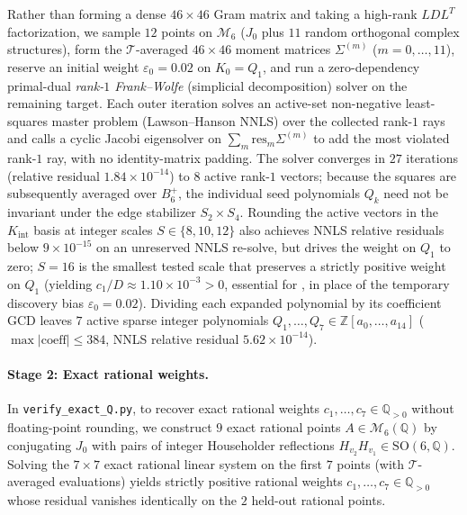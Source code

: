 \documentclass[11pt,a4paper]{article}
\theoremstyle{plain}
\theoremstyle{definition}
\theoremstyle{remark}
\newcommand{\Z}{\mathbb{Z}}
\newcommand{\Q}{\mathbb{Q}}
\newcommand{\SO}{\mathrm{SO}}
\newcommand{\Mman}{\mathcal{M}_6}
\newcommand{\Bplus}{B_6^+}
\newcommand{\code}[1]{\texttt{\small #1}}
\begin{document}
Rather than forming a dense $46 \times 46$ Gram matrix and taking a high-rank $LDL^T$ factorization, we sample $12$ points on $\Mman$ ($J_0$ plus $11$ random orthogonal complex structures), form the $\mathcal{T}$-averaged $46 \times 46$ moment matrices $\Sigma^{(m)}$ ($m = 0,\dots,11$), reserve an initial weight $\varepsilon_0 = 0.02$ on $K_0 = Q_1$, and run a zero-dependency primal-dual \emph{rank-$1$ Frank--Wolfe} (simplicial decomposition) solver on the remaining target. Each outer iteration solves an active-set non-negative least-squares master problem (Lawson--Hanson NNLS) over the collected rank-$1$ rays and calls a cyclic Jacobi eigensolver on $\sum_m \mathrm{res}_m \Sigma^{(m)}$ to add the most violated rank-$1$ ray, with no identity-matrix padding. The solver converges in $27$ iterations (relative residual $1.84 \times 10^{-14}$) to $8$ active rank-$1$ vectors; because the squares are subsequently averaged over $\Bplus$, the individual seed polynomials $Q_k$ need not be invariant under the edge stabilizer $S_2 \times S_4$. Rounding the active vectors in the $K_{\mathrm{int}}$ basis at integer scales $S \in \{8, 10, 12\}$ also achieves NNLS relative residuals below $9 \times 10^{-15}$ on an unreserved NNLS re-solve, but drives the weight on $Q_1$ to zero; $S = 16$ is the smallest tested scale that preserves a strictly positive weight on $Q_1$ (yielding $c_1/D \approx 1.10 \times 10^{-3} > 0$, essential for , in place of the temporary discovery bias $\varepsilon_0 = 0.02$). Dividing each expanded polynomial by its coefficient GCD leaves $7$ active sparse integer polynomials $Q_1, \dots, Q_7 \in \Z[a_0,\dots,a_{14}]$ ($\max\lvert\text{coeff}\rvert \le 384$, NNLS relative residual $5.62 \times 10^{-14}$).

\paragraph{Stage 2: Exact rational weights.}
In \code{verify\_exact\_Q.py}, to recover exact rational weights $c_1, \dots, c_7 \in \Q_{>0}$ without floating-point rounding, we construct $9$ exact rational points $A \in \Mman(\Q)$ by conjugating $J_0$ with pairs of integer Householder reflections $H_{v_2} H_{v_1} \in \SO(6,\Q)$. Solving the $7\times 7$ exact rational linear system on the first $7$ points (with $\mathcal{T}$-averaged evaluations) yields strictly positive rational weights $c_1, \dots, c_7 \in \Q_{>0}$ whose residual vanishes identically on the $2$ held-out rational points.
\end{document}
